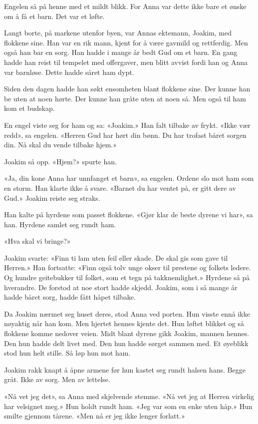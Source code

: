 Engelen så på henne med et mildt blikk.
For Anna var dette ikke bare et ønske om å få et barn.
Det var et løfte.

Langt borte, på markene utenfor byen, var Annas ektemann,
Joakim, med flokkene sine.
Han var en rik mann, kjent for å være gavmild og rettferdig.
Men også han bar en sorg.
Han hadde i mange år bedt Gud om et barn.
En gang hadde han reist til tempelet med offergaver,
men blitt avvist fordi han og Anna var barnløse.
Dette hadde såret ham dypt.

Siden den dagen hadde han søkt ensomheten blant flokkene sine.
Der kunne han be uten at noen hørte.
Der kunne han gråte uten at noen så.
Men også til ham kom et budskap.

En engel viste seg for ham og sa: «Joakim.»
Han falt tilbake av frykt.
«Ikke vær redd», sa engelen.
«Herren Gud har hørt din bønn. Du har trofast båret sorgen din.
Nå skal du vende tilbake hjem.»

Joakim så opp.
«Hjem?» spurte han.

«Ja, din kone Anna har unnfanget et barn», sa engelen.
Ordene slo mot ham som en storm. Han klarte ikke å svare.
«Barnet du har ventet på, er gitt dere av Gud.»
Joakim reiste seg straks.

Han kalte på hyrdene som passet flokkene.
«Gjør klar de beste dyrene vi har», sa han.
Hyrdene samlet seg rundt ham.

«Hva skal vi bringe?»

Joakim svarte:
«Finn ti lam uten feil eller skade. De skal gis som gave til Herren.»
Han fortsatte:
«Finn også tolv unge okser til prestene og folkets ledere.
Og hundre geitebukker til folket, som et tegn på takknemlighet.»
Hyrdene så på hverandre.
De forstod at noe stort hadde skjedd.
Joakim, som i så mange år hadde båret sorg, hadde fått håpet tilbake.

Da Joakim nærmet seg huset deres, stod Anna ved porten.
Hun visste ennå ikke nøyaktig når han kom.
Men hjertet hennes kjente det.
Hun løftet blikket og så flokkene komme nedover veien.
Midt blant dyrene gikk Joakim, mannen hennes.
Den hun hadde delt livet med.
Den hun hadde sørget sammen med.
Et øyeblikk stod hun helt stille.
Så løp hun mot ham.

Joakim rakk knapt å åpne armene før hun kastet seg rundt halsen hans.
Begge gråt.
Ikke av sorg.
Men av lettelse.

«Nå vet jeg det», sa Anna med skjelvende stemme.
«Nå vet jeg at Herren virkelig har velsignet meg.»
Hun holdt rundt ham.
«Jeg var som en enke uten håp.»
Hun smilte gjennom tårene.
«Men nå er jeg ikke lenger forlatt.»


